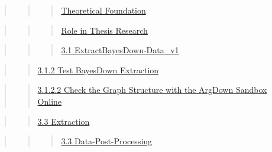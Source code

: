 \documentclass[
  letterpaper,
]{book}
\begin{document}
\begin{quote}
\begin{quote}
\begin{quote}
\hyperref[scrollTo=vUSS00TCEpeW]{Theoretical Foundation}
\end{quote}
\end{quote}
\end{quote}

\begin{quote}
\begin{quote}
\begin{quote}
\hyperref[scrollTo=vUSS00TCEpeW]{Role in Thesis Research}
\end{quote}
\end{quote}
\end{quote}

\begin{quote}
\begin{quote}
\begin{quote}
\hyperref[scrollTo=AFnu_1Ludahi]{3.1 ExtractBayesDown-Data\_v1}
\end{quote}
\end{quote}
\end{quote}

\begin{quote}
\begin{quote}
\hyperref[scrollTo=eUBJh8Qp4yd4]{3.1.2 Test BayesDown Extraction}
\end{quote}
\end{quote}

\begin{quote}
\begin{quote}
\hyperref[scrollTo=z4Hgs0ICDQyW]{3.1.2.2 Check the Graph Structure with
the ArgDown Sandbox Online}
\end{quote}
\end{quote}

\begin{quote}
\begin{quote}
\hyperref[scrollTo=mv8f4c4D3yJj]{3.3 Extraction}
\end{quote}
\end{quote}

\begin{quote}
\begin{quote}
\begin{quote}
\hyperref[scrollTo=UcXf3fZ8dahj]{3.3 Data-Post-Processing}
\end{quote}
\end{quote}
\end{quote}
\end{document}
